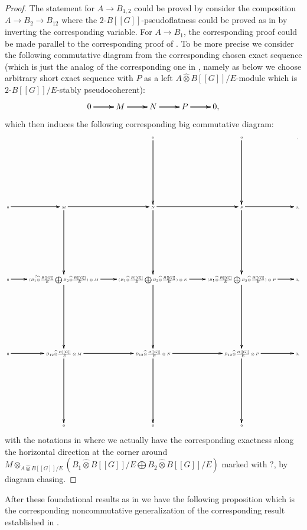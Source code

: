 \documentclass[12pt]{amsart}
\theoremstyle{definition}
\numberwithin{equation}{section}
\begin{document}
\begin{proof}
The statement for $A\rightarrow B_{1,2}$ could be proved by consider the composition $A\rightarrow B_2\rightarrow B_{12}$ where the $2$-$B[[G]]$-pseudoflatness could be proved as in \cite[Lemma 2.4.13]{KL2} by inverting the corresponding variable. For $A\rightarrow B_{1}$,
the corresponding proof could be made parallel to the corresponding proof of \cite[Lemma 2.4.13]{KL2}. To be more precise we consider the following commutative diagram from the corresponding chosen exact sequence (which is just the analog of the corresponding one in \cite[Remark 2.4.5]{KL2}, namely as below we choose arbitrary short exact sequence with $P$ as a left $A\widehat{\otimes}B[[G]]/E$-module which is $2$-$B[[G]]/E$-stably pseudocoherent):
\[
\xymatrix@C+0pc@R+0pc{
0   \ar[r]\ar[r]\ar[r] &M \ar[r]\ar[r]\ar[r] &N \ar[r]\ar[r]\ar[r] & P \ar[r]\ar[r]\ar[r] &0,
}
\]
which then induces the following corresponding big commutative diagram:
\[\tiny
\xymatrix@C+0pc@R+6pc{
& &0 \ar[d]\ar[d]\ar[d] &0 \ar[d]\ar[d]\ar[d] &,\\
0   \ar[r]\ar[r]\ar[r]  &M \ar[r]\ar[r]\ar[r] \ar[d]\ar[d]\ar[d] &N \ar[r]\ar[r]\ar[r] \ar[d]\ar[d]\ar[d] & P \ar[r]\ar[r]\ar[r] \ar[d]\ar[d]\ar[d] &0,\\
0   \ar[r]^?\ar[r]\ar[r] &({B_1\widehat{\otimes}\frac{B[[G]]}{E}}\bigoplus {B_2\widehat{\otimes}\frac{B[[G]]}{E}}) \otimes M  \ar[r]\ar[r]\ar[r] \ar[d]\ar[d]\ar[d] &({B_1\widehat{\otimes}\frac{B[[G]]}{E}}\bigoplus {B_2\widehat{\otimes}\frac{B[[G]]}{E}})\otimes N  \ar[r]\ar[r]\ar[r] \ar[d]\ar[d]\ar[d] &({B_1\widehat{\otimes}\frac{B[[G]]}{E}}\bigoplus {B_2\widehat{\otimes}\frac{B[[G]]}{E}})\otimes P\ar[r]\ar[r]\ar[r] \ar[d]\ar[d]\ar[d] &0,\\
0  \ar[r]\ar[r]\ar[r] &{B_{12}\widehat{\otimes}\frac{B[[G]]}{E}}\otimes M \ar[r]\ar[r]\ar[r] \ar[d]\ar[d]\ar[d] &{B_{12}\widehat{\otimes}\frac{B[[G]]}{E}}\otimes N \ar[r]\ar[r]\ar[r] \ar[d]\ar[d]\ar[d] &{B_{12}\widehat{\otimes}\frac{B[[G]]}{E}} \otimes P \ar[r]\ar[r]\ar[r] \ar[d]\ar[d]\ar[d] &0,\\
&0&0&0
}
\]
with the notations in \cite[Lemma 2.4.10]{KL2} where we actually have the corresponding exactness along the horizontal direction at the corner around $M\otimes_{A\widehat{\otimes}B[[G]]/E} ({B_1\widehat{\otimes}B[[G]]/E}\bigoplus {B_2\widehat{\otimes}B[[G]]/E})$ marked with $?$, by diagram chasing.
\end{proof}


\indent After these foundational results as in \cite{KL2} we have the following proposition which is the corresponding noncommutative generalization of the corresponding result established in \cite[Theorem 2.4.15]{KL2}.
\end{document}
